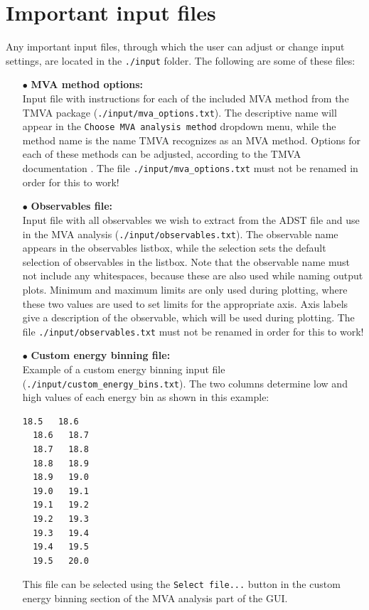 \documentclass[12pt,a4paper]{report}
\begin{document}
\section{Important input files}
Any important input files, through which the user can adjust or change input settings, are located in the \texttt{./input} folder. The following are some of these files:
\begin{itemize}
\item[$\bullet$] \textbf{MVA method options:}\\Input file with instructions for each of the included MVA method from the TMVA package (\texttt{./input/mva\_options.txt}). The descriptive name will appear in the \texttt{Choose MVA analysis method} dropdown menu, while the method name is the name TMVA recognizes as an MVA method. Options for each of these methods can be adjusted, according to the TMVA documentation \cite{tmvadocument}. The file \texttt{./input/mva\_options.txt} must not be renamed in order for this to work!
\item[$\bullet$] \textbf{Observables file:}\\Input file with all observables we wish to extract from the ADST file and use in the MVA analysis (\texttt{./input/observables.txt}). The observable name appears in the observables listbox, while the selection sets the default selection of observables in the listbox. Note that the observable name must not include any whitespaces, because these are also used while naming output plots. Minimum and maximum limits are only used during plotting, where these two values are used to set limits for the appropriate axis. Axis labels give a description of the observable, which will be used during plotting. The file \texttt{./input/observables.txt} must not be renamed in order for this to work!
\item[$\bullet$] \textbf{Custom energy binning file:}\\Example of a custom energy binning input file \\(\texttt{./input/custom\_energy\_bins.txt}). The two columns determine low and high values of each energy bin as shown in this example:
\begin{lstlisting}[language=bash]
  18.5   18.6
  18.6   18.7
  18.7   18.8
  18.8   18.9
  18.9   19.0
  19.0   19.1
  19.1   19.2
  19.2   19.3
  19.3   19.4
  19.4   19.5
  19.5   20.0
\end{lstlisting}
This file can be selected using the \texttt{Select file...} button in the custom energy binning section of the MVA analysis part of the GUI.

\end{itemize}
\end{document}
